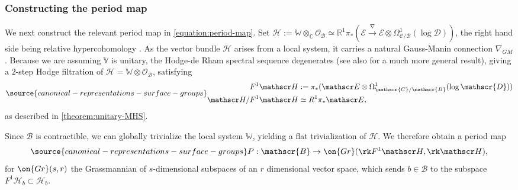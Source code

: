 \subsubsection{Constructing the period map}
\label{subsubsection:constructing-period-map}
We next construct the relevant period map in \eqref{equation:period-map}.
Set $\mathscr H:=\mathbb{W} \otimes_{\mathbb C}
\mathscr O_\mathscr{B} \simeq  \mathbb R^1
\pi_*( \mathscr E \overset{\nabla}{\to} \mathscr E \otimes \Omega^1_{\mathscr{C}/\mathscr{B}}(\log \mathscr{D}))$, the
right hand side being
relative hypercohomology \cite[Corollaire 6.10, Proposition 6.14]{deligne:regular-singular}.
As the vector bundle $\mathscr{H}$ arises from a local system, it carries a natural Gauss-Manin connection $\nabla_{GM}$.
Because we are assuming $\mathbb V$ is unitary, the Hodge-de Rham spectral sequence
degenerates \cite[Theorem 7.1(a)]{timmerscheidt:mixed-hodge-structure-for-unitary} (see also \cite[Th\'eor\`eme 5.3.1]{saito1988modules} for a much more general result),
giving a $2$-step Hodge filtration of
$\mathscr H = \mathbb W \otimes \mathscr O_\mathscr{B}$, satisfying
\begin{equation}
	\label{equation:h-filtration}
\source{canonical-representations-surface-groups}
\begin{aligned}
F^1 \mathscr H &:= \pi_* (\mathscr E \otimes
\Omega^1_{\mathscr{C}/\mathscr{B}}(\log\mathscr{D})) \\
\mathscr H/ F^1 \mathscr H &\simeq R^1 \pi_* \mathscr E,
\end{aligned}
\end{equation}
as described in \autoref{theorem:unitary-MHS}.

Since $\mathscr{B}$ is contractible, we can globally trivialize the local system $\mathbb W$, yielding a flat trivialization of $\mathscr{H}$.
We therefore obtain a period map
\begin{align}
	\label{equation:period-map}
\source{canonical-representations-surface-groups}
	P: \mathscr{B} \to \on{Gr}(\rk F^1 \mathscr H, \rk \mathscr H),
\end{align}
for $\on{Gr}(s, r)$ the Grassmannian of $s$-dimensional subspaces of an $r$
dimensional vector space, which sends $b\in \mathscr{B}$ to the subspace $F^1\mathscr{H}_b\subset \mathscr{H}_b$.

